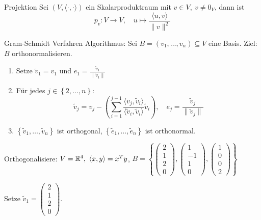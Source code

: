 \documentclass[12pt]{article}
\begin{document}
\begin{definition}{Projektion}{}
    Sei $(V, \langle \cdot, \cdot \rangle)$ ein Skalarproduktraum mit $v \in V,\ v \neq 0_V$, dann ist
    $$
        p_v: V \rightarrow V,\quad u \mapsto \frac{\langle u, v \rangle}{\lVert v \rVert^2}
    $$
\end{definition}

\begin{definition}{Gram-Schmidt Verfahren}{}
    Algorithmus: Sei $B = (v_1,\dots,v_n) \subseteq V$ eine Basis. Ziel: $B$ orthonormalisieren.
    \begin{enumerate}
        \item Setze $\tilde v_1 = v_1$ und $e_1 = \frac{\tilde v_1}{\lVert \tilde v_1 \rVert}$
        \item Für jedes $j \in \left\{2,\dots,n\right\}$:
        $$
            \tilde v_j = v_j - \left( \sum_{i = 1}^{j -1} \frac{\langle v_j, \tilde v_i \rangle}{\langle \tilde v_i, \tilde v_i \rangle} \tilde v_i  \right), \quad e_j = \frac{\tilde v_j}{\lVert \tilde v_j \rVert}
        $$

        \item $\left\{ \tilde v_1,\dots,\tilde v_n \right\}$ ist orthogonal, $\left\{ \tilde e_1,\dots,\tilde e_n \right\}$ ist orthonormal.
    \end{enumerate}
\end{definition}

\begin{exercise}{}{}
    Orthogonalisiere: $V = \mathbb{R}^4,\ \langle x, y \rangle = x^Ty$, $B = 
    \left\{
        \begin{pmatrix} 2 \\ 1 \\ 2 \\ 0 \end{pmatrix},
        \begin{pmatrix} 1 \\ -1 \\ 1 \\ 0 \end{pmatrix},
        \begin{pmatrix} 1 \\ 0 \\ 0 \\ 2 \end{pmatrix}
    \right\}
    $
\end{exercise}

Setze $\tilde v_1 = \begin{pmatrix} 2 \\ 1 \\ 2 \\ 0 \end{pmatrix}$.
\end{document}
